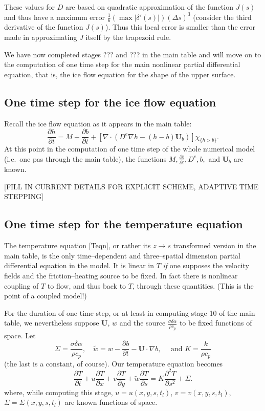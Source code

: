 \documentclass{amsart}%
\theoremstyle{plain}
\theoremstyle{definition}
\theoremstyle{remark}
\newcommand{\ddt}[1]{\ensuremath{\frac{\partial #1}{\partial t}}}
\newcommand{\ddx}[1]{\ensuremath{\frac{\partial #1}{\partial x}}}
\newcommand{\ddy}[1]{\ensuremath{\frac{\partial #1}{\partial y}}}
\newcommand{\dds}[1]{\ensuremath{\frac{\partial #1}{\partial s}}}
\newcommand{\dddsds}[1]{\ensuremath{\frac{\partial^2 #1}{\partial s^2}}}
\newcommand{\diverg}{\nabla\cdot}
\newcommand{\grad}{\nabla}
\newcommand{\bU}{{\mathbf{U}}}
\begin{document}
These values for $D$ are based on quadratic approximation of the function $J(s)$ and thus have a maximum error $\frac{1}{6} \left(\max |\delta'(s)|\right) (\Delta s)^3$ (consider the third derivative of the function $J(s)$).  Thus this local error is smaller than the error made in approximating $J$ itself by the trapezoid rule.

We have now completed stages ??? and ??? in the main table and will move on to the computation of one time step for the main nonlinear partial differential equation, that is, the ice flow equation for the shape of the upper surface.

\subsection{One time step for the ice flow equation}  Recall the ice flow equation as it appears in the main table:
\begin{equation}\label{iceagain}
\ddt{h}= M + \ddt{b} + \left[\diverg \left(D^e \grad h - (h-b)\bU_b\right)\right]\chi_{\{h>b\}}.\end{equation}
At this point in the computation of one time step of the whole numerical model (i.e.~one pas through the main table), the functions $M,\ddt{b},D^e,b,$ and $\bU_b$ are known.

[FILL IN CURRENT DETAILS FOR EXPLICIT SCHEME, ADAPTIVE TIME STEPPING]

\subsection{One time step for the temperature equation}

The temperature equation \eqref{Teqn}, or rather its $z\to s$ transformed version in the main table, is the only time--dependent and three--spatial dimension partial differential equation in the model.  It is linear in $T$ \emph{if} one supposes the velocity fields and the friction--heating source to be fixed.  In fact there is nonlinear coupling of $T$ to flow, and thus back to $T$, through these quantities.  (This is the point of a coupled model!)

For the duration of one time step, or at least in computing stage 10 of the main table, we nevertheless suppose $\bU$, $w$ and the source $\frac{\sigma\delta\alpha}{\rho c_p}$ to be fixed functions of space.  Let
    $$\Sigma = \frac{\sigma\delta\alpha}{\rho c_p}, \quad \tilde w=w-\ddt{b}-\bU\cdot \grad b, \quad \text{ and } K=\frac{k}{\rho c_p}$$
(the last is a constant, of course).  Our temperature equation becomes
\begin{equation}\label{simpTemp}
\ddt{T}+u\ddx{T}+v\ddy{T}+\tilde w \dds{T} = K \dddsds{T}+\Sigma.
\end{equation}
where, while computing this stage, $u=u(x,y,s,t_l)$, $v=v(x,y,s,t_l)$, $\Sigma=\Sigma(x,y,s,t_l)$ are known functions of space.
\end{document}
